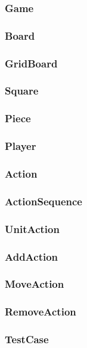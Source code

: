 \subsubsection{Game}

\subsubsection{Board}

\subsubsection{GridBoard}

\subsubsection{Square}

\subsubsection{Piece}

\subsubsection{Player}

\subsubsection{Action}

\subsubsection{ActionSequence}

\subsubsection{UnitAction}

\subsubsection{AddAction}

\subsubsection{MoveAction}

\subsubsection{RemoveAction}

\subsubsection{TestCase}
